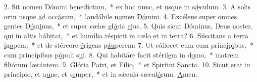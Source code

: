 2. Sit nomen Dómini b\uline{e}ned\uline{í}ctum,~* ex hoc nunc, et \uline{u}sque in s\uline{ǽ}culum.
3. A solis ortu usque \uline{a}d occ\uline{á}sum,~* laudábile n\uline{o}men D\uline{ó}mini.
4. Excélsus super omnes gentes D\uline{ó}m\uline{i}nus,~* et super cælos gl\uline{ó}ria \uline{e}jus.
5. Quis sicut Dóminus, Deus noster, qui in altis h\uline{á}b\uline{i}tat,~* et humília réspicit in cælo \uline{e}t in t\uline{e}rra?
6. Súscitans a terra \uline{í}n\uline{o}pem,~* et de stércore \uline{é}rigens p\uline{áu}perem:
7. Ut cóllocet eum cum princ\uline{í}p\uline{i}bus,~* cum princípibus p\uline{ó}puli s\uline{u}i.
8. Qui habitáre facit stéril\uline{e}m in d\uline{o}mo,~* matrem fili\uline{ó}rum læt\uline{á}ntem.
9. Glória Patri, et F\uline{í}l\uline{i}o,~* et Spir\uline{í}tui S\uline{a}ncto.
10. Sicut erat in princípio, et n\uline{u}nc, et s\uline{e}mper,~* et in sǽcula sæcul\uline{ó}rum. \uline{A}men.
